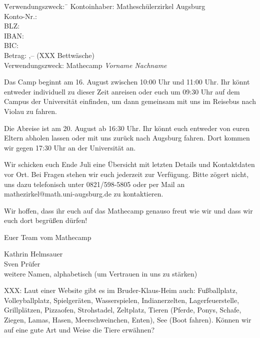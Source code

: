 \documentclass{zettel}
\begin{document}
\vspace{-0.7em}
\begin{tabbing}
  \qquad\qquad \= Verwendungszweck:\, \= \kill
  \> Kontoinhaber: \> Matheschülerzirkel Augsburg \\
  \> Konto-Nr.:  \\
  \> BLZ:  \\
  \> IBAN:  \\
  \> BIC:  \\
  \> Betrag: ,-- \texteuro (XXX Bettwäsche) \\
  \> Verwendungszweck: \> Mathecamp \emph{Vorname Nachname}
\end{tabbing}
\vspace{-0.7em}

Das Camp beginnt am 16. August zwischen 10:00 Uhr und 11:00 Uhr. Ihr könnt
entweder individuell zu dieser Zeit anreisen oder euch um 09:30 Uhr auf dem Campus der
Universität einfinden, um dann gemeinsam mit uns im Reisebus nach Violau zu fahren.

Die Abreise ist am 20. August ab 16:30 Uhr. Ihr könnt euch entweder von euren
Eltern abholen lassen oder mit uns zurück nach Augsburg fahren. Dort kommen wir
gegen 17:30 Uhr an der Universität an.

Wir schicken euch Ende Juli eine Übersicht mit
letzten Details und Kontaktdaten vor Ort. Bei Fragen stehen wir euch jederzeit
zur Verfügung. Bitte zögert nicht, uns dazu telefonisch unter 0821/598-5805 oder per
Mail an \textsf{mathezirkel@math.uni-augsburg.de} zu kontaktieren.

Wir hoffen, dass ihr euch auf das Mathecamp genauso freut wie wir und dass wir
euch dort begrüßen dürfen!

\vspace{2em}

Euer Team vom Mathecamp

Kathrin Helmsauer \\
Sven Prüfer \\
weitere Namen, alphabetisch (um Vertrauen in uns zu stärken)

\vfill

XXX: Laut einer Website gibt es im Bruder-Klaus-Heim auch:
Fußballplatz, Volleyballplatz, Spielgeräten, Wasserspielen, Indianerzelten,
Lagerfeuerstelle, Grillplätzen, Pizzaofen, Strohstadel, Zeltplatz, Tieren
(Pferde, Ponys, Schafe, Ziegen, Lamas, Hasen, Meerschweinchen, Enten), See
(Boot fahren). Können wir auf eine gute Art und Weise die Tiere erwähnen?

\end{document}
